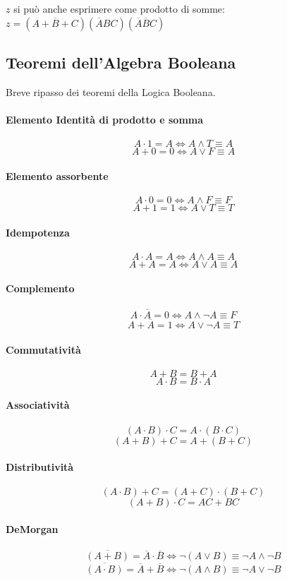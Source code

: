 $ z $ si può anche esprimere come prodotto di somme: $ z = (A+\overbar{B}+C)(\overbar{A}BC)(\overbar{A}\overbar{B}C) $


\subsection{Teoremi dell'Algebra Booleana}
Breve ripasso dei teoremi della Logica Booleana.
\paragraph{Elemento Identità di prodotto e somma}
\[ A \cdot 1 = A \iff A \land T \equiv A\]
\[ A + 0 = 0 \iff A \lor F \equiv A\]
\paragraph{Elemento assorbente}
\[ A \cdot 0 = 0 \iff A \land F \equiv F \]
\[ A + 1 = 1 \iff A \lor T \equiv T \]
\paragraph{Idempotenza}
\[ A \cdot A = A \iff A \land A \equiv A \]
\[ A + A = A \iff A \lor A \equiv A \]
\paragraph{Complemento}
\[ A \cdot \overbar{A} = 0 \iff A \land \lnot A \equiv F \]
\[ A + \overbar{A} = 1 \iff A \lor \lnot A \equiv T \]
\paragraph{Commutatività}
\[ A + B = B + A \]
\[ A \cdot B = B \cdot A \]
\paragraph{Associatività}
\[ (A \cdot B) \cdot C = A \cdot (B \cdot C) \]
\[ (A + B) + C = A + (B + C) \]
\paragraph{Distributività}
\[ (A \cdot B) + C = (A+C) \cdot (B+C) \]
\[ (A+B) \cdot C = AC + BC \]
\paragraph{DeMorgan}
\[ \overbar{(A + B)} = \overbar{A} \cdot \overbar{B} \iff \lnot(A \lor B )\equiv \lnot A \land \lnot B \]
\[ \overbar{(A \cdot B)} = \overbar{A} + \overbar{B} \iff \lnot(A \land B )\equiv \lnot A \lor \lnot B \]

